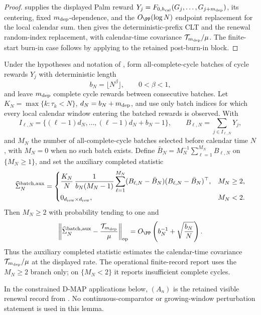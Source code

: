 \begin{proof}
 supplies the displayed
Palm reward \(Y_j=F_{0,h_{\rm cal}}(G_j,\ldots,G_{j+m_{\rm dep}})\), its
centering, fixed \(m_{\rm dep}\)-dependence, and the
\(O_{\PP}(\log N)\) endpoint replacement for the local calendar sum.
 then gives the
deterministic-prefix CLT and the renewal random-index replacement, with
calendar-time covariance \(\mathcal T_{m_{\rm dep}}/\mu\).  The finite-start
burn-in case follows by applying
 to the retained
post-burn-in block.
\end{proof}

\begin{lemma}\label{lem:finite-lag-separated-batch-main}
Under the hypotheses and notation of
, form all-complete-cycle batches of
cycle rewards \(Y_j\) with deterministic length
\[
b_N=\lfloor N^\beta\rfloor,\qquad 0<\beta<1,
\]
and leave \(m_{\rm dep}\) complete cycle rewards between consecutive batches.
Let \(K_N=\max\{k:\tau_k<N\}\), \(d_N=b_N+m_{\rm dep}\), and use only batch
indices for which every local calendar window entering the batched rewards is
observed.  With
\[
I_{\ell,N}=\{(\ell-1)d_N,\ldots,(\ell-1)d_N+b_N-1\},
\qquad
B_{\ell,N}=\sum_{j\in I_{\ell,N}}Y_j,
\]
and \(M_N\) the number of all-complete-cycle batches selected before calendar
time \(N\), with \(M_N=0\) when no such batch exists.  Define
\(\bar B_N=M_N^{-1}\sum_{\ell=1}^{M_N}B_{\ell,N}\) on
\(\{M_N\ge1\}\), and set the auxiliary completed statistic
\[
\widehat\Sigma_N^{\rm batch,aux}
=
\begin{cases}
\displaystyle
\frac{K_N}{N}\,
\frac1{b_N(M_N-1)}
\sum_{\ell=1}^{M_N}(B_{\ell,N}-\bar B_N)(B_{\ell,N}-\bar B_N)^\top,
&M_N\ge2,\\[1.1ex]
0_{d_{\rm rew}\times d_{\rm rew}},
&M_N<2 .
\end{cases}
\]
Then \(M_N\ge2\) with probability tending to one and
\begin{equation}\label{eq:finite-lag-separated-batch-rate-main}
\left\|\widehat\Sigma_N^{\rm batch,aux}
-\frac{\mathcal T_{m_{\rm dep}}}{\mu}\right\|_{\operatorname{op}}
=O_{\PP}\left(b_N^{-1}+\sqrt{\frac{b_N}{N}}\right).
\end{equation}
Thus the auxiliary completed statistic estimates the calendar-time covariance
\(\mathcal T_{m_{\rm dep}}/\mu\) at the displayed rate.  The operational
finite-record report uses the \(M_N\ge2\) branch only; on \(\{M_N<2\}\) it
reports insufficient complete cycles.

In the constrained D-MAP applications below, \((A_n)\) is the retained visible
renewal record from .  No
continuous-comparator or growing-window perturbation statement is used in this
lemma.
\end{lemma}

